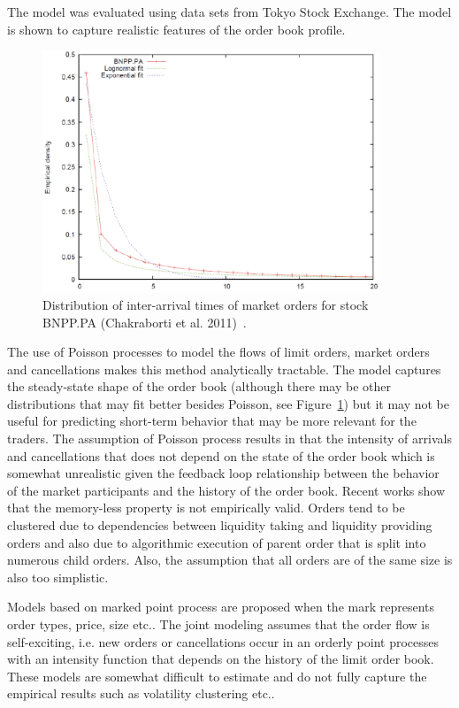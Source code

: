 The model was evaluated using data sets from Tokyo Stock Exchange. The model is shown to capture realistic features of the order book profile.
	\begin{figure}[!ht]
   	\centering
   	\includegraphics[width=0.9\textwidth]{chapters/chapter_trade_data_models/figures/intertime.png} 
   	\caption{Distribution of inter-arrival times of market orders for stock BNPP.PA (Chakraborti et al. 2011)~\cite{chaktokpat}. \label{fig:intertimefig}}
	\end{figure}


The use of Poisson processes to model the flows of limit orders, market orders and cancellations makes this method analytically tractable. The model captures the steady-state shape of the order book (although there may be other distributions that may fit better besides Poisson, see Figure~\ref{fig:intertimefig}) but it may not be useful for predicting short-term behavior that may be more relevant for the traders. The assumption of Poisson process results in that the intensity of arrivals and cancellations that does not depend on the state of the order book which is somewhat unrealistic given the feedback loop relationship between the behavior of the market participants and the history of the order book. Recent works show that the memory-less property is not empirically valid. Orders tend to be clustered due to dependencies between liquidity taking and liquidity providing orders and also due to algorithmic execution of parent order that is split into numerous child orders. Also, the assumption that all orders are of the same size is also too simplistic. 


Models based on marked point process are proposed when the mark represents order types, price, size etc.. The joint modeling assumes that the order flow is self-exciting, i.e. new orders or cancellations occur in an orderly point processes with an intensity function that depends on the history of the limit order book. These models are somewhat difficult to estimate and do not fully capture the empirical results such as volatility clustering etc.. \\


